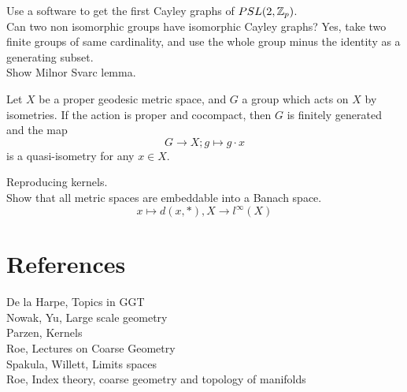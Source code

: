 Use a software to get the first Cayley graphs of $PSL(2,\mathbb Z_p)$.\\

Can two non isomorphic groups have isomorphic Cayley graphs? Yes, take two finite groups of same cardinality, and use the whole group minus the identity as a generating subset.\\

Show Milnor Svarc lemma.\\

\begin{thm}
Let $X$ be a proper geodesic metric space, and $G$ a group which acts on $X$ by isometries. If the action is proper and cocompact, then $G$ is finitely generated and the map
\[G \rightarrow X ; g\mapsto g\cdot x\]
is a quasi-isometry for any $x\in X$.
\end{thm}

Reproducing kernels.\\

Show that all metric spaces are embeddable into a Banach space. 
\[x\mapsto d(x, *), X\rightarrow l^\infty (X)\]

\section{References}

De la Harpe, Topics in GGT\\
Nowak, Yu, Large scale geometry\\
Parzen, Kernels\\
Roe, Lectures on Coarse Geometry\\
Spakula, Willett, Limits spaces\\
Roe, Index theory, coarse geometry and topology of manifolds\\
